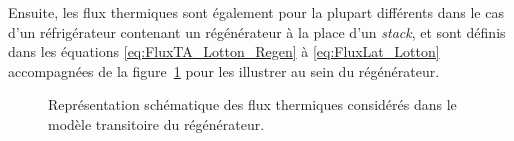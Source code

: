 Ensuite, les flux thermiques sont également pour la plupart différents dans le cas d'un réfrigérateur contenant un régénérateur à la place d'un \textit{stack}, et sont définis dans les équations \eqref{eq:FluxTA_Lotton_Regen} à \eqref{eq:FluxLat_Lotton} accompagnées de la figure~\ref{fig:Schema_FluxThermiquesNoyau_Gaelle} pour les illustrer au sein du régénérateur.

\begin{figure}[!ht]
    \centering
    
    \caption{Représentation schématique des flux thermiques considérés dans le modèle transitoire du régénérateur.}
    \label{fig:Schema_FluxThermiquesNoyau_Gaelle}
\end{figure}


